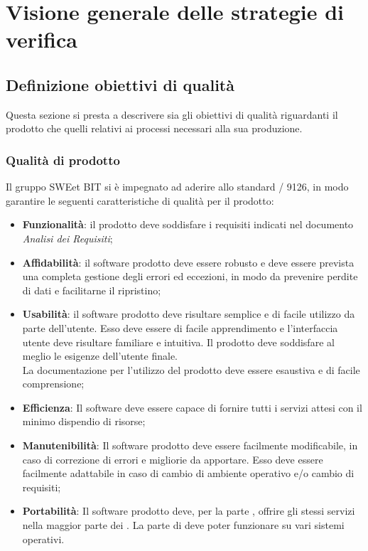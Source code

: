 \section{Visione generale delle strategie di verifica}
  \subsection{Definizione obiettivi di qualità}
  Questa sezione si presta a descrivere sia gli obiettivi di qualità riguardanti il prodotto
  che quelli relativi ai processi necessari alla sua produzione.
    \subsubsection{Qualità di prodotto}
    Il gruppo SWEet BIT si è impegnato ad aderire allo standard / 9126, in modo garantire
    le seguenti caratteristiche di qualità per il prodotto:
    \begin{itemize}
      \item \textbf{Funzionalità}: il prodotto deve soddisfare i requisiti indicati nel documento \emph{Analisi dei Requisiti};

      \item \textbf{Affidabilità}: il software prodotto deve essere robusto e deve essere prevista una completa gestione degli errori ed eccezioni,
       in modo da prevenire perdite di dati e facilitarne il ripristino;

      \item \textbf{Usabilità}: il software prodotto deve risultare semplice e di facile utilizzo da parte dell'utente.
      Esso deve essere di facile apprendimento e l'interfaccia utente deve risultare familiare e intuitiva. Il prodotto deve soddisfare al meglio le esigenze dell'utente finale. \\
      La documentazione per l'utilizzo del prodotto deve essere esaustiva e di facile comprensione;

      \item \textbf{Efficienza}: Il software deve essere capace di fornire tutti i servizi attesi con il minimo dispendio di risorse;

      \item \textbf{Manutenibilità}: Il software prodotto deve essere facilmente modificabile, in caso di correzione di errori e migliorie da apportare. Esso deve essere facilmente
      adattabile in caso di cambio di ambiente operativo e/o cambio di requisiti;

      \item \textbf{Portabilità}: Il software prodotto deve, per la parte , offrire gli stessi servizi nella maggior parte dei .
      La parte di  deve poter funzionare su vari sistemi operativi.
    \end{itemize}

